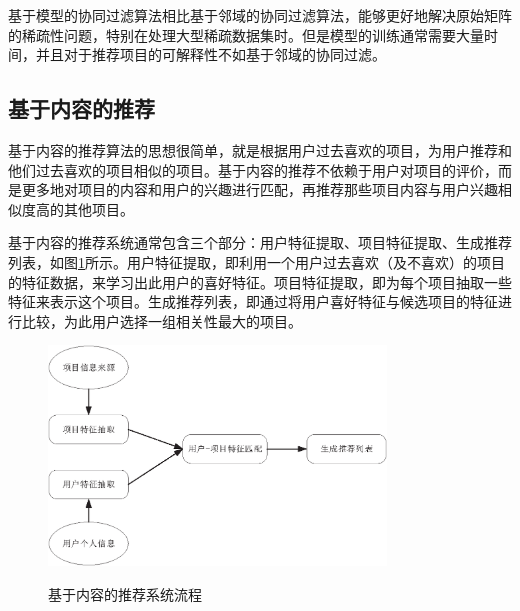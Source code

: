 \documentclass[master,winfonts]{njuthesis}
\begin{document}
\begin{enumerate}
基于模型的协同过滤算法相比基于邻域的协同过滤算法，能够更好地解决原始矩阵的稀疏性问题，特别在处理大型稀疏数据集时。但是模型的训练通常需要大量时间，并且对于推荐项目的可解释性不如基于邻域的协同过滤。
\end{enumerate}

\subsection{基于内容的推荐}
基于内容的推荐算法的思想很简单，就是根据用户过去喜欢的项目，为用户推荐和他们过去喜欢的项目相似的项目。基于内容的推荐不依赖于用户对项目的评价，而是更多地对项目的内容和用户的兴趣进行匹配，再推荐那些项目内容与用户兴趣相似度高的其他项目。

基于内容的推荐系统通常包含三个部分：用户特征提取、项目特征提取、生成推荐列表，如图\ref{fig:4}所示。用户特征提取，即利用一个用户过去喜欢（及不喜欢）的项目的特征数据，来学习出此用户的喜好特征。项目特征提取，即为每个项目抽取一些特征来表示这个项目。生成推荐列表，即通过将用户喜好特征与候选项目的特征进行比较，为此用户选择一组相关性最大的项目。
\begin{figure}[htbp]
  \centering
  \includegraphics[width=0.8\textwidth]{Content_based.eps}\\
  \caption{基于内容的推荐系统流程}\label{fig:4}
\end{figure}
\end{document}
